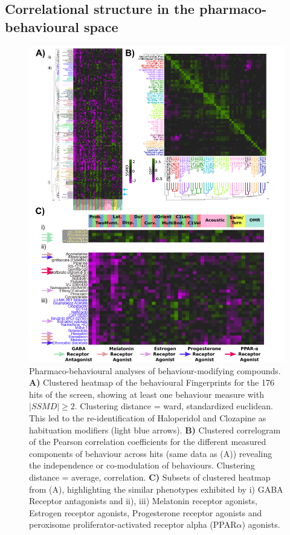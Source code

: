 \documentclass[9pt,lineno]{RandlettLab_elife}
\begin{document}
\subsection{Correlational structure in the pharmaco-behavioural space }

\begin{figure}
\begin{fullwidth}
\begin{center}
\includegraphics[width=0.87\linewidth]{Figure_2-ClusterFigure.png}
\caption{
Pharmaco-behavioural analyses of behaviour-modifying compounds. 
\textbf{A)} Clustered heatmap of the behavioural Fingerprints for the 176 hits of the screen, showing at least one behaviour measure with $ |SSMD| \geq 2 $. Clustering distance = ward, standardized euclidean. This led to the re-identification of Haloperidol and Clozapine as habituation modifiers (light blue arrows). 
\textbf{B)} Clustered correlogram of the Pearson correlation coefficients for the different measured components of behaviour across hits (same data as (A)) revealing the independence or co-modulation of behaviours. Clustering distance = average, correlation. 
\textbf{C)} Subsets of clustered heatmap from (A), highlighting the similar phenotypes exhibited by i) GABA Receptor antagonists and ii), iii) Melatonin receptor agonists, Estrogen receptor agonists, Progesterone receptor agonists and peroxisome proliferator-activated receptor alpha (PPAR$\alpha$) agonists. 
}
\label{fig:2}
\end{center}
\end{fullwidth}
\end{figure}
\end{document}
